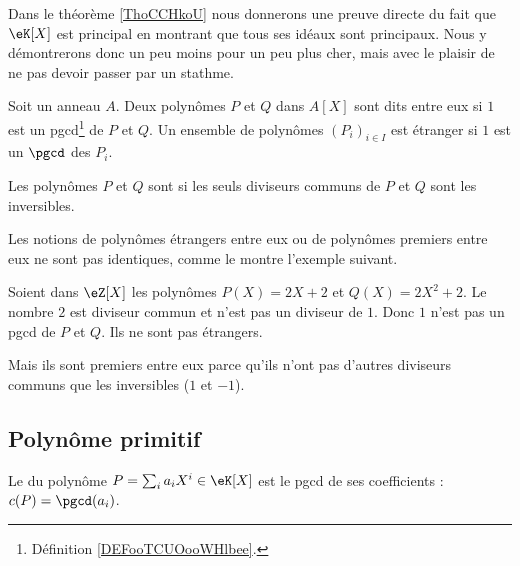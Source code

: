 Dans le théorème \ref{ThoCCHkoU} nous donnerons une preuve directe du fait que \( \eK[X]\) est principal en montrant que tous ses idéaux sont principaux. Nous y démontrerons donc un peu moins pour un peu plus cher, mais avec le plaisir de ne pas devoir passer par un stathme.

\begin{definition}  \label{DefDSFooZVbNAX}
    Soit un anneau \( A\). Deux polynômes \( P\) et \( Q\) dans \( A[X]\) sont dits  entre eux si \( 1\) est un pgcd\footnote{Définition \ref{DEFooTCUOooWHlbee}.} de \( P\) et \( Q\). Un ensemble de polynômes \( (P_i)_{i\in I}\) est étranger  si \( 1\) est un \( \pgcd\) des \( P_i\).
    
Les polynômes \( P\) et \( Q\) sont  si les seuls diviseurs communs de \( P\) et \( Q\) sont les inversibles.
\end{definition}

Les notions de polynômes étrangers entre eux ou de polynômes premiers entre eux ne sont pas identiques, comme le montre l'exemple suivant.

\begin{example}
    Soient dans \( \eZ[X]\) les polynômes \( P(X)=2X+2\) et \( Q(X)=2X^2+2\). Le nombre \( 2\) est diviseur commun et n'est pas un diviseur de \( 1\). Donc \( 1\) n'est pas un pgcd de \( P\) et \( Q\). Ils ne sont pas étrangers.

    Mais ils sont premiers entre eux parce qu'ils n'ont pas d'autres diviseurs communs que les inversibles (\( 1\) et \( -1\)).
\end{example}

\subsection{Polynôme primitif}

\begin{definition}\label{DefContenuPolynome}
    Le  du polynôme \( P=\sum_ia_iX^i\in\eK[X]\) est le pgcd de ses coefficients : $c(P)=\pgcd(a_i)$.
\end{definition}

